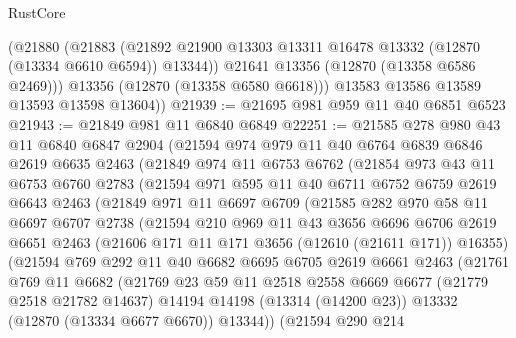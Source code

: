 \begin{lexlean}{RustCore}
\begin{coremodule}
          (@21880
            (@21883
              (@21892 @21900 @13303 @13311 @16478 @13332 (@12870 (@13334 @6610 @6594)) @13344))
            @21641
            @13356
            (@12870 (@13358 @6586 @2469)))
          @13356
          (@12870 (@13358 @6580 @6618)))
        @13583
        @13586
        @13589
        @13593
        @13598
        @13604))
@21939 := @21695 @981 @959 @11 @40 @6851 @6523
@21943 := @21849 @981 @11 @6840 @6849
@22251 := @21585
    @278
    @980
    @43
    @11
    @6840
    @6847
    @2904
    (@21594
      @974
      @979
      @11
      @40
      @6764
      @6839
      @6846
      @2619
      @6635
      @2463
      (@21849
        @974
        @11
        @6753
        @6762
        (@21854
          @973
          @43
          @11
          @6753
          @6760
          @2783
          (@21594
            @971
            @595
            @11
            @40
            @6711
            @6752
            @6759
            @2619
            @6643
            @2463
            (@21849
              @971
              @11
              @6697
              @6709
              (@21585
                @282
                @970
                @58
                @11
                @6697
                @6707
                @2738
                (@21594
                  @210
                  @969
                  @11
                  @43
                  @3656
                  @6696
                  @6706
                  @2619
                  @6651
                  @2463
                  (@21606 @171 @11 @171 @3656 (@12610 (@21611 @171)) @16355)
                  (@21594
                    @769
                    @292
                    @11
                    @40
                    @6682
                    @6695
                    @6705
                    @2619
                    @6661
                    @2463
                    (@21761
                      @769
                      @11
                      @6682
                      (@21769
                        @23
                        @59
                        @11
                        @2518
                        @2558
                        @6669
                        @6677
                        (@21779 @2518 @21782 @14637)
                        @14194
                        @14198
                        (@13314 (@14200 @23))
                        @13332
                        (@12870 (@13334 @6677 @6670))
                        @13344))
                    (@21594
                      @290
                      @214

\end{coremodule}
\end{lexlean}
